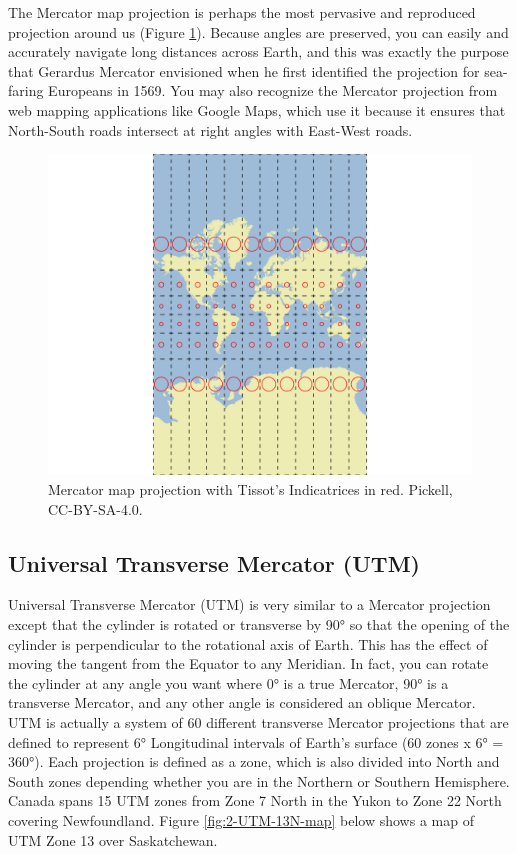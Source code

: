 \documentclass[
]{book}
\begin{document}
The Mercator map projection is perhaps the most pervasive and reproduced projection around us (Figure \ref{fig:2-Mercator-map}). Because angles are preserved, you can easily and accurately navigate long distances across Earth, and this was exactly the purpose that Gerardus Mercator envisioned when he first identified the projection for sea-faring Europeans in 1569. You may also recognize the Mercator projection from web mapping applications like Google Maps, which use it because it ensures that North-South roads intersect at right angles with East-West roads.

\begin{figure}
\includegraphics[width=0.75\linewidth]{images/02-Mercator-map} \caption{Mercator map projection with Tissot's Indicatrices in red. Pickell, CC-BY-SA-4.0.}\label{fig:2-Mercator-map}
\end{figure}

\hypertarget{universal-transverse-mercator-utm}{%
\subsection{Universal Transverse Mercator (UTM)}\label{universal-transverse-mercator-utm}}

Universal Transverse Mercator (UTM) is very similar to a Mercator projection except that the cylinder is rotated or transverse by 90° so that the opening of the cylinder is perpendicular to the rotational axis of Earth. This has the effect of moving the tangent from the Equator to any Meridian. In fact, you can rotate the cylinder at any angle you want where 0° is a true Mercator, 90° is a transverse Mercator, and any other angle is considered an oblique Mercator. UTM is actually a system of 60 different transverse Mercator projections that are defined to represent 6° Longitudinal intervals of Earth's surface (60 zones x 6° = 360°). Each projection is defined as a zone, which is also divided into North and South zones depending whether you are in the Northern or Southern Hemisphere. Canada spans 15 UTM zones from Zone 7 North in the Yukon to Zone 22 North covering Newfoundland. Figure \ref{fig:2-UTM-13N-map} below shows a map of UTM Zone 13 over Saskatchewan.
\end{document}
